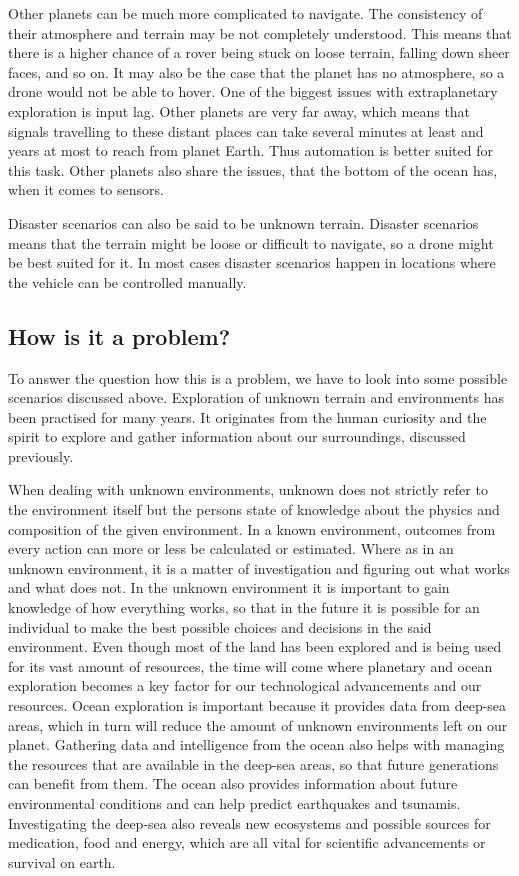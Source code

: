 Other planets can be much more complicated to navigate. The consistency of their atmosphere and terrain may be not completely understood. This means that there is a higher chance of a rover being stuck on loose terrain, falling down sheer faces, and so on. It may also be the case that the planet has no atmosphere, so a drone would not be able to hover. One of the biggest issues with extraplanetary exploration is input lag. Other planets are very far away, which means that signals travelling to these distant places can take several minutes at least and years at most to reach from planet Earth. Thus automation is better suited for this task. Other planets also share the issues, that the bottom of the ocean has, when it comes to sensors.

Disaster scenarios can also be said to be unknown terrain. Disaster scenarios means that the terrain might be loose or difficult to navigate, so a drone might be best suited for it. In most cases disaster scenarios happen in locations where the vehicle can be controlled manually.

\subsection{How is it a problem?}

To answer the question how this is a problem, we have to look into some possible scenarios discussed above. Exploration of unknown terrain and environments has been practised for many years. It originates from the human curiosity and the spirit to explore and gather information about our surroundings, discussed previously.

When dealing with unknown environments, unknown does not strictly refer to the environment itself but the persons state of knowledge about the physics and composition of the given environment. In a known environment, outcomes from every action can more or less be calculated or estimated. Where as in an unknown environment, it is a matter of investigation and figuring out what works and what does not. In the unknown environment it is important to gain knowledge of how everything works, so that in the future it is possible for an individual to make the best possible choices and decisions in the said environment.\cite{aiint}
Even though most of the land has been explored and is being used for its vast amount of resources, the time will come where planetary and ocean exploration becomes a key factor for our technological advancements and our resources. Ocean exploration is important because it provides data from deep-sea areas, which in turn will reduce the amount of unknown environments left on our planet.
Gathering data and intelligence from the ocean also helps with managing the resources that are available in the deep-sea areas, so that future generations can benefit from them. The ocean also provides information about future environmental conditions and can help predict earthquakes and tsunamis. Investigating the deep-sea also reveals new ecosystems and possible sources for medication, food and energy, which are all vital for scientific advancements or survival on earth.\cite{oceanexplo}

